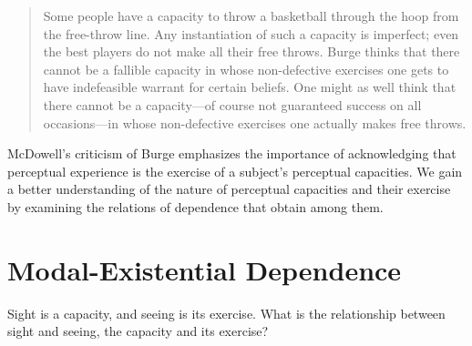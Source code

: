 \documentclass[12pt]{article}
\begin{document}
\begin{quote}
	Some people have a capacity to throw a basketball through the hoop from the free-throw line. Any instantiation of such a capacity is imperfect; even the best players do not make all their free throws. Burge thinks that there cannot be a fallible capacity in whose non-defective exercises one gets to have indefeasible warrant for certain beliefs. One might as well think that there cannot be a capacity---of course not guaranteed success on all occasions---in whose non-defective exercises one actually makes free throws. \citep[245--6]{McDowell:2010fk}
\end{quote}
McDowell's criticism of Burge emphasizes the importance of acknowledging that perceptual experience is the exercise of a subject's perceptual capacities. We gain a better understanding of the nature of perceptual capacities and their exercise by examining the relations of dependence that obtain among them.



\section{Modal-Existential Dependence} %
\label{sec:modal-existential_dependence}

Sight is a capacity, and seeing is its exercise. What is the relationship between sight and seeing, the capacity and its exercise?
\end{document}
